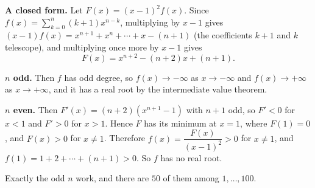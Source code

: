 \textbf{A closed form.} Let $F(x)=(x-1)^2f(x)$. Since $f(x)=\sum_{k=0}^{n}(k+1)x^{n-k}$, multiplying by $x-1$ gives $(x-1)f(x)=x^{n+1}+x^n+\cdots+x-(n+1)$ (the coefficients $k+1$ and $k$ telescope), and multiplying once more by $x-1$ gives
\[
F(x)=x^{n+2}-(n+2)x+(n+1).
\]

\textbf{$n$ odd.} Then $f$ has odd degree, so $f(x)\to-\infty$ as $x\to-\infty$ and $f(x)\to+\infty$ as $x\to+\infty$, and it has a real root by the intermediate value theorem.

\textbf{$n$ even.} Then $F'(x)=(n+2)\left(x^{n+1}-1\right)$ with $n+1$ odd, so $F'<0$ for $x<1$ and $F'>0$ for $x>1$. Hence $F$ has its minimum at $x=1$, where $F(1)=0$, and $F(x)>0$ for $x\ne1$. Therefore $f(x)=\dfrac{F(x)}{(x-1)^2}>0$ for $x\ne1$, and $f(1)=1+2+\cdots+(n+1)>0$. So $f$ has no real root.

Exactly the odd $n$ work, and there are $\boxed{50}$ of them among $1,\dots,100$.

